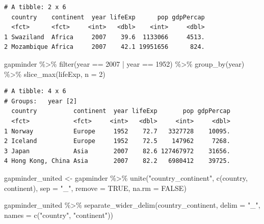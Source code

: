 \documentclass[
  portuguese,
  letterpaper,
  DIV=11,
  numbers=noendperiod]{scrreprt}
\newenvironment{Shaded}{\begin{snugshade}}{\end{snugshade}}
\newcommand{\AttributeTok}[1]{\textcolor[rgb]{0.40,0.45,0.13}{#1}}
\newcommand{\ConstantTok}[1]{\textcolor[rgb]{0.56,0.35,0.01}{#1}}
\newcommand{\DecValTok}[1]{\textcolor[rgb]{0.68,0.00,0.00}{#1}}
\newcommand{\FunctionTok}[1]{\textcolor[rgb]{0.28,0.35,0.67}{#1}}
\newcommand{\NormalTok}[1]{\textcolor[rgb]{0.00,0.23,0.31}{#1}}
\newcommand{\OtherTok}[1]{\textcolor[rgb]{0.00,0.23,0.31}{#1}}
\newcommand{\SpecialCharTok}[1]{\textcolor[rgb]{0.37,0.37,0.37}{#1}}
\newcommand{\StringTok}[1]{\textcolor[rgb]{0.13,0.47,0.30}{#1}}
\theoremstyle{definition}
\theoremstyle{remark}
\begin{document}
\begin{verbatim}
# A tibble: 2 x 6
  country    continent  year lifeExp      pop gdpPercap
  <fct>      <fct>     <int>   <dbl>    <int>     <dbl>
1 Swaziland  Africa     2007    39.6  1133066     4513.
2 Mozambique Africa     2007    42.1 19951656      824.
\end{verbatim}

\begin{Shaded}
\begin{Highlighting}[]
\NormalTok{gapminder }\SpecialCharTok{\%\textgreater{}\%} 
  \FunctionTok{filter}\NormalTok{(year }\SpecialCharTok{==} \DecValTok{2007} \SpecialCharTok{|}\NormalTok{ year }\SpecialCharTok{==} \DecValTok{1952}\NormalTok{) }\SpecialCharTok{\%\textgreater{}\%} 
  \FunctionTok{group\_by}\NormalTok{(year) }\SpecialCharTok{\%\textgreater{}\%} 
  \FunctionTok{slice\_max}\NormalTok{(lifeExp, }\AttributeTok{n =} \DecValTok{2}\NormalTok{)}
\end{Highlighting}
\end{Shaded}

\begin{verbatim}
# A tibble: 4 x 6
# Groups:   year [2]
  country          continent  year lifeExp       pop gdpPercap
  <fct>            <fct>     <int>   <dbl>     <int>     <dbl>
1 Norway           Europe     1952    72.7   3327728    10095.
2 Iceland          Europe     1952    72.5    147962     7268.
3 Japan            Asia       2007    82.6 127467972    31656.
4 Hong Kong, China Asia       2007    82.2   6980412    39725.
\end{verbatim}

\begin{Shaded}
\begin{Highlighting}[]
\NormalTok{gapminder\_united }\OtherTok{\textless{}{-}}\NormalTok{ gapminder }\SpecialCharTok{\%\textgreater{}\%} 
  \FunctionTok{unite}\NormalTok{(}\StringTok{"country\_continent"}\NormalTok{, }\FunctionTok{c}\NormalTok{(country, continent),}
        \AttributeTok{sep =} \StringTok{"\_"}\NormalTok{,}
        \AttributeTok{remove =} \ConstantTok{TRUE}\NormalTok{,}
        \AttributeTok{na.rm =} \ConstantTok{FALSE}\NormalTok{)}

\NormalTok{gapminder\_united }\SpecialCharTok{\%\textgreater{}\%}
  \FunctionTok{separate\_wider\_delim}\NormalTok{(country\_continent,}
                       \AttributeTok{delim =} \StringTok{"\_"}\NormalTok{,}
                       \AttributeTok{names =} \FunctionTok{c}\NormalTok{(}\StringTok{"country"}\NormalTok{, }\StringTok{"continent"}\NormalTok{))}
\end{Highlighting}
\end{Shaded}
\end{document}
